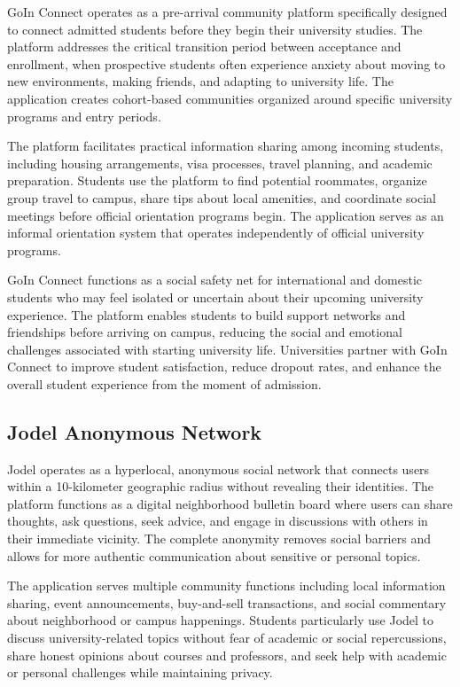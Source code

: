 GoIn Connect \cite{goinconnect} operates as a pre-arrival community platform specifically designed to connect admitted students before they begin their university studies. The platform addresses the critical transition period between acceptance and enrollment, when prospective students often experience anxiety about moving to new environments, making friends, and adapting to university life. The application creates cohort-based communities organized around specific university programs and entry periods.

The platform facilitates practical information sharing among incoming students, including housing arrangements, visa processes, travel planning, and academic preparation. Students use the platform to find potential roommates, organize group travel to campus, share tips about local amenities, and coordinate social meetings before official orientation programs begin. The application serves as an informal orientation system that operates independently of official university programs.

GoIn Connect functions as a social safety net for international and domestic students who may feel isolated or uncertain about their upcoming university experience. The platform enables students to build support networks and friendships before arriving on campus, reducing the social and emotional challenges associated with starting university life. Universities partner with GoIn Connect to improve student satisfaction, reduce dropout rates, and enhance the overall student experience from the moment of admission.

\subsection{Jodel Anonymous Network}

Jodel \cite{jodel} operates as a hyperlocal, anonymous social network that connects users within a 10-kilometer geographic radius without revealing their identities. The platform functions as a digital neighborhood bulletin board where users can share thoughts, ask questions, seek advice, and engage in discussions with others in their immediate vicinity. The complete anonymity removes social barriers and allows for more authentic communication about sensitive or personal topics.

The application serves multiple community functions including local information sharing, event announcements, buy-and-sell transactions, and social commentary about neighborhood or campus happenings. Students particularly use Jodel to discuss university-related topics without fear of academic or social repercussions, share honest opinions about courses and professors, and seek help with academic or personal challenges while maintaining privacy.


